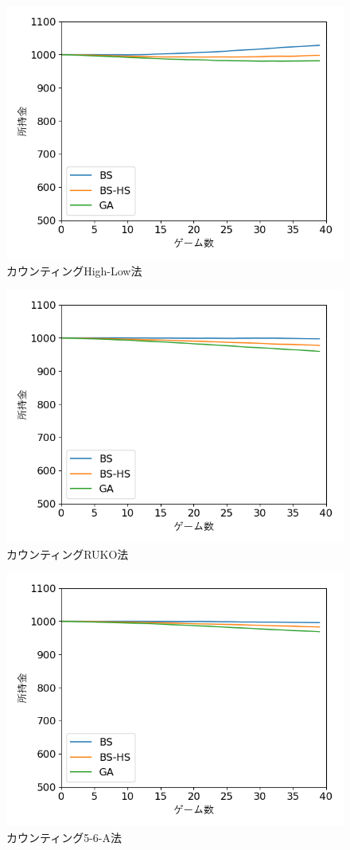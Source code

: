 \begin{figure}[H]
 \begin{center} 
  \includegraphics[width=0.7\linewidth]{./figure/Hi-Lo}
  \caption{カウンティングHigh-Low法\label{Hi-Lo}}
 \end{center}
\end{figure}

\begin{figure}[H]
 \begin{center} 
  \includegraphics[width=0.7\linewidth]{./figure/RUKO}
  \caption{カウンティングRUKO法\label{RUKO}}
 \end{center}
\end{figure}

\begin{figure}[H]
 \begin{center} 
  \includegraphics[width=0.7\linewidth]{./figure/56A}
  \caption{カウンティング5-6-A法\label{56A}}
 \end{center}
\end{figure}


